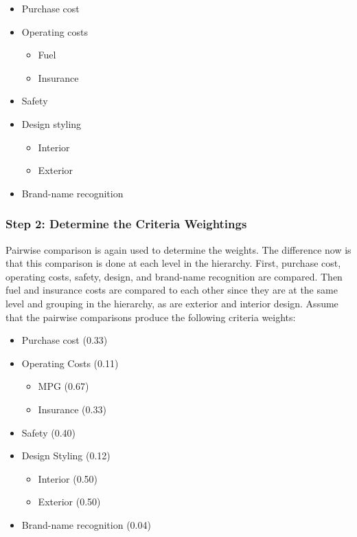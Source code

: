 \begin{itemize}
\item   Purchase cost
\item   Operating costs

  \begin{itemize}
  \item     Fuel
  \item     Insurance
  \end{itemize}
\item   Safety
\item   Design styling

  \begin{itemize}
  \item     Interior
  \item     Exterior
  \end{itemize}
\item   Brand-name recognition
\end{itemize}

\subsubsection*{Step 2: Determine the Criteria Weightings}

Pairwise comparison is again used to determine the weights. The
difference now is that this comparison is done at each level in the
hierarchy. First, purchase cost, operating costs, safety, design, and
brand-name recognition are compared. Then fuel and insurance costs are
compared to each other since they are at the same level and grouping in
the hierarchy, as are exterior and interior design. Assume that the
pairwise comparisons produce the following criteria weights:

\begin{itemize}
\item   Purchase cost (0.33)
\item   Operating Costs (0.11)

  \begin{itemize}
  \item    MPG (0.67)
  \item    Insurance (0.33)
  \end{itemize}
\item  Safety (0.40)
\item  Design Styling (0.12)

  \begin{itemize}
  \item    Interior (0.50)
  \item    Exterior (0.50)
  \end{itemize}
\item  Brand-name recognition (0.04)
\end{itemize}

